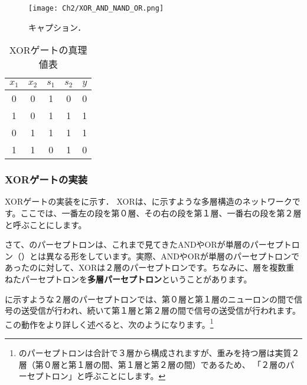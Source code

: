 \begin{figure}[h]
  \vspace{0mm}
  \begin{center}
    \hspace{0mm}
    \centering
    \texttt{[image: Ch2/XOR\_AND\_NAND\_OR.png]} \
    \vspace{0mm}
    \caption{キャプション．}
    \label{fig:2_XOR_AND_NAND_OR}
  \end{center}
\end{figure}

\begin{table}[htb]
    \centering
    \begin{tabular}{cc|cc|c}
        $x_1$ & $x_2$ & $s_1$& $s_2$& $y$ \\  %
        \hline
        \hline
        0 & 0 & 1 & 0 & 0 \\  %
        \midrule
        1 & 0 & 1& 1& 1 \\  %
        \midrule  %
        0 & 1 & 1& 1& 1 \\ 
        \midrule  %
        1 & 1 & 0& 1& 0 \\
        \end{tabular}
    \caption{XORゲートの真理値表}
    \label{tab:2_XOR_AND_NAND_OR}
\end{table}

\subsubsection{XORゲートの実装}
XORゲートの実装をに示す．
XORは、に示すような多層構造のネットワークです。ここでは、一番左の段を第０層、その右の段を第１層、一番右の段を第２層と呼ぶことにします。

さて、のパーセプトロンは、これまで見てきたANDやORが単層のパーセプトロン（）とは異なる形をしています。実際、ANDやORが単層のパーセプトロンであったのに対して、XORは２層のパーセプトロンです。ちなみに、層を複数重ねたパーセプトロンを\textbf{多層パーセプトロン}ということがあります。

に示すような２層のパーセプトロンでは、第０層と第１層のニューロンの間で信号の送受信が行われ、続いて第１層と第２層の間で信号の送受信が行われます。この動作をより詳しく述べると、次のようになります。\footnote{    のパーセプトロンは合計で３層から構成されますが、重みを持つ層は実質２層（第０層と第１層の間、第１層と第２層の間）であるため、
「２層のパーセプトロン」と呼ぶことにします。}

